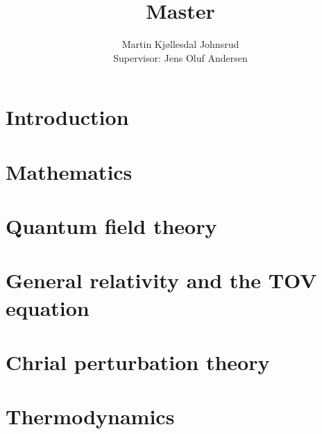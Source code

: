 \documentclass{book}
\title{\huge{Master}}
\author{
    \large{Martin Kjøllesdal Johnsrud}\\
    \normalsize{Supervisor: Jens Oluf Andersen}
    }
\begin{document}
    \maketitle
    \listoftodos
    \clearpage
    \tableofcontents
   
    \setlength{\parindent}{0em}
    \setlength{\parskip}{0.8em}

    \chapter{Introduction}
    \label{chapter: introduction}
    


    \chapter{Mathematics}
    \label{chapter: math}
    
    

    \chapter{Quantum field theory}
    \label{chapter: QFT}
    
    
    
    
    

    \chapter{General relativity and the TOV equation}
    \label{chapter: GR}
    
    
    

    \chapter{Chrial perturbation theory}
    \label{chapter: chpt}
    
    
    

    \chapter{Thermodynamics}
    \label{chapter: thermodynamics}
    
    
    
    
\end{document}
